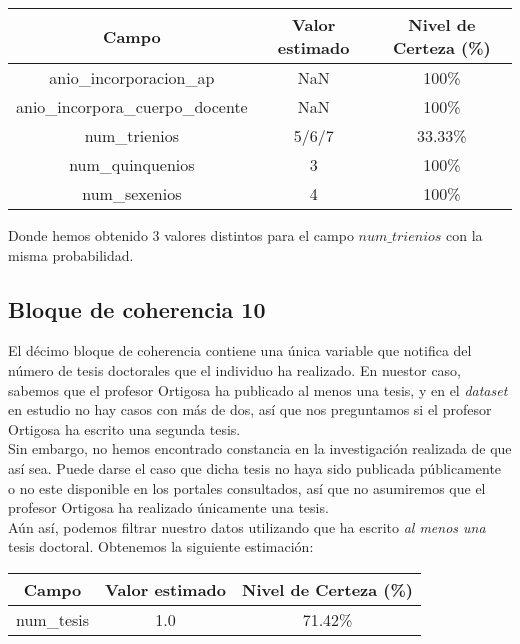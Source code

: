 \documentclass[a4paper]{article}
\begin{document}
\begin{table}[H]
	\centering
	\begin{tabular}{ccc}
		\textbf{Campo}                   & \textbf{Valor estimado}   & \textbf{Nivel de Certeza (\%)} \\ \hline
		anio\_incorporacion\_ap          & NaN & 100\%                           \\
		anio\_incorpora\_cuerpo\_docente & NaN                      & 100\%                          \\
		num\_trienios                    & 5/6/7                         & 33.33\%                           \\
		num\_quinquenios                 & 3                         & 100\%                          \\
		num\_sexenios                    & 4                         & 100\%                          \\
		\end{tabular}
\end{table}

Donde hemos obtenido 3 valores distintos para el campo $num\_trienios$ con la misma probabilidad.

\subsection{Bloque de coherencia 10}

El décimo bloque de coherencia contiene una única variable que notifica del número de tesis doctorales que el individuo ha realizado. En nuestor caso, sabemos que el profesor Ortigosa ha publicado al menos una tesis, y en el \emph{dataset} en estudio no hay casos con más de dos, así que nos preguntamos si el profesor Ortigosa ha escrito una segunda tesis. \\

Sin embargo, no hemos encontrado constancia en la investigación realizada de que así sea. Puede darse el caso que dicha tesis no haya sido publicada públicamente o no este disponible en los portales consultados, así que no asumiremos que el profesor Ortigosa ha realizado únicamente una tesis. \\

Aún así, podemos filtrar nuestro datos utilizando que ha escrito \emph{al menos una} tesis doctoral. Obtenemos la siguiente estimación:

\begin{table}[H]
	\centering
	\begin{tabular}{ccc}
		\textbf{Campo}                   & \textbf{Valor estimado} & \textbf{Nivel de Certeza (\%)} \\ \hline
		num\_tesis                       & 1.0                     & 71.42\%                        \\
	\end{tabular}
\end{table}
\end{document}
